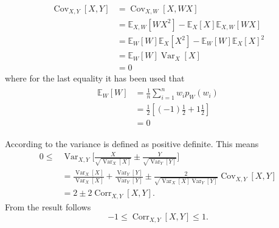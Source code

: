 \begin{example}
\begin{enumerate}
		\begin{equation}
			\begin{split}
				\operatorname{Cov}_{X,Y}[X,Y] &= \operatorname{Cov}_{X,W}[X,WX] \\
				&= \mathbb{E}_{X,W}[WX^2]-\mathbb{E}_X[X]\mathbb{E}_{X,W}[WX]\\
				&= \mathbb{E}_W[W]\mathbb{E}_X[X^2]-\mathbb{E}_W[W]\mathbb{E}_X[X]^2\\
				&= \mathbb{E}_W[W]\operatorname{Var}_X[X]\\
				& = 0
			\end{split}
		\end{equation}
		where for the last equality it has been used that
		\begin{equation}
			\begin{split}
				\begin{split}
					\mathbb{E}_W[W]&= \frac{1}{n}\sum_{i=1}^nw_ip_W(w_i)\\
					&= \frac{1}{2}[(-1)\frac{1}{2}+1\frac{1}{2}]\\
					&= 0
				\end{split}
			\end{split}
		\end{equation}
		
	\end{enumerate}
	
\end{example}

\begin{example}
	According to  the variance is defined as positive definite. This means
	\begin{equation}
		\label{eq:corr_deriv}
		\begin{split}
			0\leq& \operatorname{Var}_{X,Y}\bigg[\frac{X}{\sqrt{\operatorname{Var}_{X}[X]}}\pm\frac{Y}{\sqrt{\operatorname{Var}_{Y}[Y]}}\bigg]\\
			& = \frac{\operatorname{Var}_X[X]}{\operatorname{Var}_{X}[X]}+\frac{\operatorname{Var}_Y[Y]}{\operatorname{Var}_{Y}[Y]}\pm \frac{2}{\sqrt{\operatorname{Var}_{X}[X]\operatorname{Var}_{Y}[Y]}}\operatorname{Cov}_{X,Y}[X,Y]\\
			& = 2\pm 2\operatorname{Corr}_{X,Y}[X,Y].
		\end{split}
	\end{equation}
	 From  the result follows
	\begin{equation}
		-1\leq \operatorname{Corr}_{X,Y}[X,Y]\leq 1.
	\end{equation}	
\end{example}

